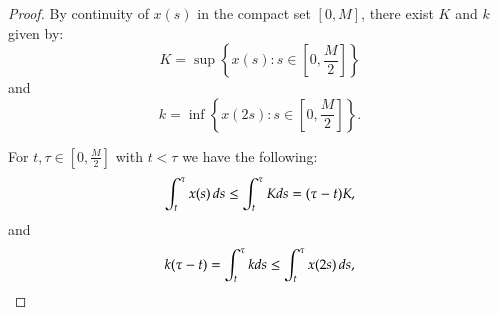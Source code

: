 \documentclass{amsart}
\begin{document}
\begin{proof}
By continuity of $x(s)$ in the compact set $[0,M]$, there exist  $K$ and $k$ given by:
 \begin{equation*}
      K=\sup\left\{x(s)\colon s \in \left[0,\frac{M}{2}\right]\right\}
 \end{equation*}
 and
 \begin{equation*}
      k=\inf\left\{x(2s)\colon s \in \left[0,\frac{M}{2}\right]\right\}.
 \end{equation*}

 For $t, \tau\in [0,\frac{M}{2}]$ with $t<\tau$ we have the following:
 \begin{equation}\label{de1}
     \int_{t}^{\tau} x(s)\thinspace ds\leq \int_{t}^{\tau} K  ds=(\tau-t)K,
 \end{equation}
 and
 \begin{equation}\label{de12}
     k(\tau-t)=\int_{t}^{\tau} k ds\leq \int_{t}^{\tau} x(2s)\thinspace ds,
 \end{equation}
 

\end{proof}
\end{document}
